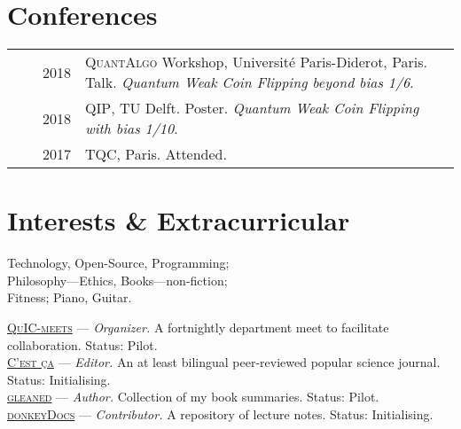 \documentclass[a4paper,10pt]{article}
\begin{document}
\section{Conferences}
\begin{tabular}{rrp{11cm}}
  & ~~2018 &\textsc{QuantAlgo} Workshop, Université Paris-Diderot, Paris. Talk. \emph{Quantum Weak Coin Flipping beyond bias 1/6}. \\  
  & ~~2018 &\textsc{QIP}, TU Delft. Poster. \emph{Quantum Weak Coin Flipping with bias 1/10}. \\
  & ~~2017 &\textsc{TQC}, Paris. Attended.
  \end{tabular}


\section{Interests \& Extracurricular}
Technology, Open-Source, Programming;\\ 
Philosophy---Ethics, Books---non-fiction; \\
Fitness; Piano, Guitar.

\textsc{\href{https://quic-meets.github.io}{QuIC-meets}} --- \emph{Organizer.} {\footnotesize A fortnightly department meet to facilitate collaboration. Status: Pilot. } \\
\textsc{\href{https://c-est-ca.github.io}{C'est ça}} --- \emph{Editor.} {\footnotesize An at least bilingual peer-reviewed popular science journal. Status: Initialising. }\\
\textsc{\href{https://gleaned.github.io}{gleaned}} --- \emph{Author.} {\footnotesize Collection of my book summaries. Status: Pilot.}\\
\textsc{\href{https://donkeydocs.github.io}{donkeyDocs}} --- \emph{Contributor.} {\footnotesize A repository of lecture notes. Status: Initialising. }\\
\end{document}

